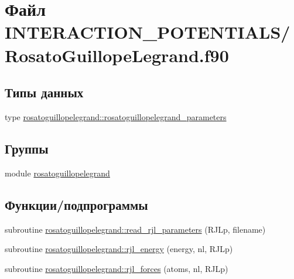 \hypertarget{_rosato_guillope_legrand_8f90}{}\section{Файл I\+N\+T\+E\+R\+A\+C\+T\+I\+O\+N\+\_\+\+P\+O\+T\+E\+N\+T\+I\+A\+L\+S/\+Rosato\+Guillope\+Legrand.f90}
\label{_rosato_guillope_legrand_8f90}
\subsection*{Типы данных}
\begin{DoxyCompactItemize}
\item 
type \mbox{\hyperlink{structrosatoguillopelegrand_1_1rosatoguillopelegrand__parameters}{rosatoguillopelegrand\+::rosatoguillopelegrand\+\_\+parameters}}
\end{DoxyCompactItemize}
\subsection*{Группы}
\begin{DoxyCompactItemize}
\item 
module \mbox{\hyperlink{namespacerosatoguillopelegrand}{rosatoguillopelegrand}}
\end{DoxyCompactItemize}
\subsection*{Функции/подпрограммы}
\begin{DoxyCompactItemize}
\item 
subroutine \mbox{\hyperlink{namespacerosatoguillopelegrand_ac5fa55316f7b8e860b3131c6f95c10ae}{rosatoguillopelegrand\+::read\+\_\+rjl\+\_\+parameters}} (R\+J\+Lp, filename)
\item 
subroutine \mbox{\hyperlink{namespacerosatoguillopelegrand_a06b6c23e50e301e053ed9ccb60e1ca34}{rosatoguillopelegrand\+::rjl\+\_\+energy}} (energy, nl, R\+J\+Lp)
\item 
subroutine \mbox{\hyperlink{namespacerosatoguillopelegrand_a3744fc3d1e6df3ca288ddc43df483ca0}{rosatoguillopelegrand\+::rjl\+\_\+forces}} (atoms, nl, R\+J\+Lp)
\end{DoxyCompactItemize}
